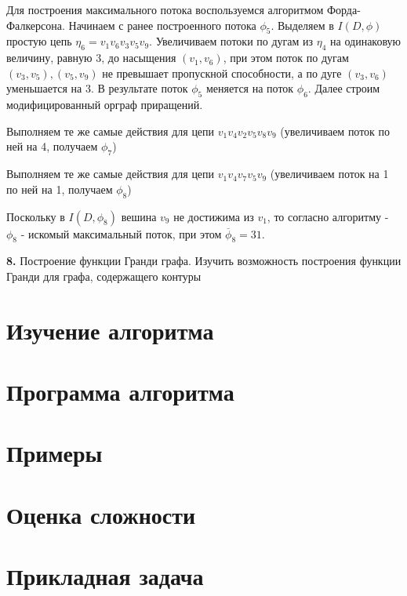 \documentclass[12pt, letterpaper, titlepage]{article}
\begin{document}
Для построения  максимального потока воспользуемся алгоритмом Форда-Фалкерсона.
Начинаем с ранее построенного потока $\phi_5$. Выделяем в $I(D,\phi)$
простую цепь $\eta_6=v_1v_6v_3v_5v_9$. Увеличиваем потоки по дугам из $\eta_4$
на одинаковую величину, равную 3, до насыщения $(v_1,v_6)$, при этом поток по дугам $(v_3,v_5),(v_5,v_9)$
не превышает пропускной способности, а по дуге $(v_3,v_6)$ уменьшается на 3.
В результате поток $\phi_5$ меняется на поток $\phi_6$. Далее строим модифицированный орграф приращений.
\begin{figure}[H]
    \centering
    \begin{minipage}{0.48\linewidth}
        
    \end{minipage}
    \begin{minipage}{0.48\linewidth}
        
    \end{minipage}
    \caption{}
\end{figure}
Выполняем те же самые действия для цепи $v_1v_4v_2v_5v_8v_9$ (увеличиваем поток по ней на 4, получаем $\phi_7$)
\begin{figure}[H]
    \centering
    \begin{minipage}{0.48\linewidth}
        
    \end{minipage}
    \begin{minipage}{0.48\linewidth}
        
    \end{minipage}
    \caption{}
\end{figure}
Выполняем те же самые действия для цепи $v_1v_4v_7v_5v_9$ (увеличиваем поток на 1 по ней на 1, получаем $\phi_8$)
\begin{figure}[H]
    \centering
    \begin{minipage}{0.48\linewidth}
        
    \end{minipage}
    \begin{minipage}{0.48\linewidth}
        
    \end{minipage}
    \caption{}
\end{figure}
Поскольку в $I(D,\phi_8)$ вешина $v_9$ не достижима из $v_1$, то согласно алгоритму - $\phi_8$ - искомый максимальный поток,
при этом $\overline\phi_8=31$.

\textbf{8.} Построение функции Гранди графа. Изучить возможность построения
функции Гранди для графа, содержащего контуры
\section{Изучение алгоритма}
\section{Программа алгоритма}
\section{Примеры}
\section{Оценка сложности}
\section{Прикладная задача}
\end{document}
